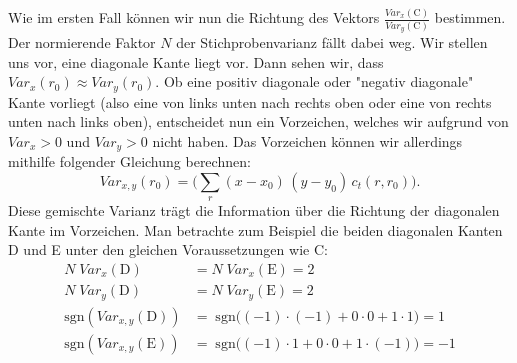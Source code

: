 \documentclass[a4paper, 11pt]{report}
\theoremstyle{definition}
\begin{document}
 			Wie im ersten Fall können wir nun die Richtung des Vektors $\frac{Var_x(\text{C})}{Var_y(\text{C})}$ bestimmen. Der normierende Faktor $N$ der Stichprobenvarianz fällt dabei weg. Wir stellen uns vor, eine diagonale Kante liegt vor.
 			Dann sehen wir, dass $Var_x(r_0) \approx Var_y(r_0)$. Ob eine \glqq positiv diagonale\grqq{} oder "negativ diagonale" Kante vorliegt (also eine von links unten nach rechts oben oder eine von rechts unten nach links oben), entscheidet nun ein Vorzeichen, welches wir aufgrund von $Var_x > 0$ und $Var_y > 0$ nicht haben.
 			Das Vorzeichen können wir allerdings mithilfe folgender Gleichung berechnen:
 			$$ Var_{x,y}(r_0) = \bigg(\sum_r (x-x_0) \, (y-y_0) \, c_t(r,r_0)\bigg).$$
 			Diese \glqq gemischte Varianz\grqq{} trägt die Information über die Richtung der diagonalen Kante im Vorzeichen.
 			Man betrachte zum Beispiel die beiden diagonalen Kanten D und E unter den gleichen Voraussetzungen wie C:
 			 \begin{align*}
 				N \; Var_x(\text{D}) &= N \; Var_x(\text{E}) = 2 \\
 				N \; Var_y(\text{D}) &= N \; Var_y(\text{E}) = 2 \\
 				\text{sgn}(Var_{x,y}(\text{D})) 	&=\;\text{sgn}\bigg((-1) \cdot (-1)+ 0 \cdot 0 +1 \cdot 1\bigg) = 1\\
 				\text{sgn}(Var_{x,y}(\text{E}))		&=\;\text{sgn}\bigg((-1) \cdot 1+ 0 \cdot 0 +1 \cdot (-1)\bigg) = -1\\
 			\end{align*}
 			
\end{document}
